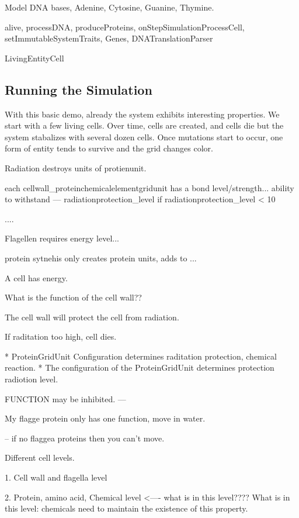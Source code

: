 Model DNA bases, Adenine, Cytosine, Guanine, Thymine.

alive, processDNA, produceProteins, onStepSimulationProcessCell,
setImmutableSystemTraits, Genes, DNATranslationParser

LivingEntityCell

\subsection{Running the Simulation} 

With this basic demo, already the system exhibits interesting properties.  We
start with a few living cells.  Over time, cells are created, and cells die but
the system stabalizes with  several dozen cells.  Once mutations start to occur,
one form of entity tends to survive and the grid changes color.


Radiation destroys units of protienunit.

each cellwall_proteinchemicalelementgridunit has a bond level/strength...
  ability to withstand --- radiationprotection_level
    if radiationprotection_level < 10%
    
    ....
    
    Flagellen requires energy level...   
    
    protein sytnehis only creates protein units, adds to ...
    
    
    
A cell has energy.

What is the function of the cell wall??

The cell wall will protect the cell from radiation.

If raditation too high, cell dies.

  * ProteinGridUnit Configuration determines raditation protection, chemical reaction.
  * The configuration of the ProteinGridUnit determines protection radiotion level.
  
  FUNCTION may be inhibited.
---

My flagge protein only has one function, move in water.

 -- if no flaggea proteins then you can't move.   
 
 Different cell levels.

1. Cell wall and flagella level

2. Protein, amino acid, Chemical level <---- what is in this level????
   What is in this level:  chemicals need to maintain the existence of this
                          property.

